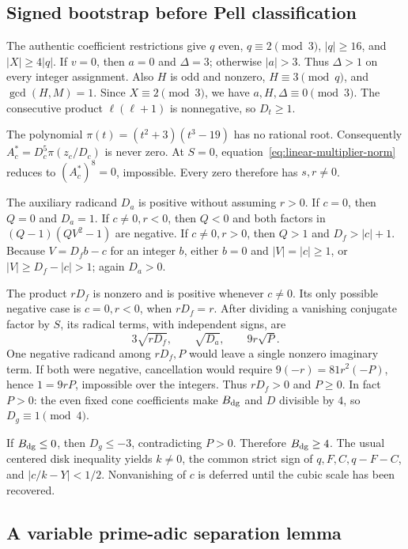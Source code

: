 \subsection{Signed bootstrap before Pell classification}

The authentic coefficient restrictions give
$q$ even, $q\equiv2\pmod3$, $|q|\ge16$, and $|X|\ge4|q|$.
If $v=0$, then $a=0$ and $\Delta=3$; otherwise $|a|>3$.
Thus $\Delta>1$ on every integer assignment. Also $H$ is odd and
nonzero, $H\equiv3\pmod q$, and $\gcd(H,M)=1$.
Since $X\equiv2\pmod3$, we have $a,H,\Delta\equiv0\pmod3$.
The consecutive product $\ell(\ell+1)$ is nonnegative, so $D_t\ge1$.

The polynomial $\pi(t)=(t^2+3)(t^3-19)$ has no rational root.
Consequently $A_c^{\ast}=D_c^5\pi(z_c/D_c)$ is never zero.
At $S=0$, equation~\eqref{eq:linear-multiplier-norm} reduces to
$(A_c^{\ast})^8=0$, impossible. Every zero therefore has $s,r\ne0$.

The auxiliary radicand $D_a$ is positive without assuming $r>0$.
If $c=0$, then $Q=0$ and $D_a=1$. If $c\ne0,r<0$, then $Q<0$ and
both factors in $(Q-1)(QV^2-1)$ are negative. If $c\ne0,r>0$, then
$Q>1$ and $D_f>|c|+1$. Because $V=D_fb-c$ for an integer $b$, either
$b=0$ and $|V|=|c|\ge1$, or $|V|\ge D_f-|c|>1$; again $D_a>0$.

The product $rD_f$ is nonzero and is positive whenever $c\ne0$.
Its only possible negative case is $c=0,r<0$, when $rD_f=r$.
After dividing a vanishing conjugate factor by $S$, its radical terms,
with independent signs, are
\begin{equation}
 3\sqrt{rD_f},\qquad \sqrt{D_a},\qquad 9r\sqrt P.
 \label{eq:linear-radicals}
\end{equation}
One negative radicand among $rD_f,P$ would leave a single nonzero
imaginary term. If both were negative, cancellation would require
$9(-r)=81r^2(-P)$, hence $1=9rP$, impossible over the integers.
Thus $rD_f>0$ and $P\ge0$. In fact $P>0$: the even fixed cone
coefficients make $B_{\rm dg}$ and $D$ divisible by $4$, so
$D_g\equiv1\pmod4$.

If $B_{\rm dg}\le0$, then $D_g\le-3$, contradicting $P>0$.
Therefore $B_{\rm dg}\ge4$. The usual centered disk inequality yields
$k\ne0$, the common strict sign of $q,F,C,q-F-C$, and
$|c/k-Y|<1/2$. Nonvanishing of $c$ is deferred until the cubic scale
has been recovered.

\subsection{A variable prime-adic separation lemma}

